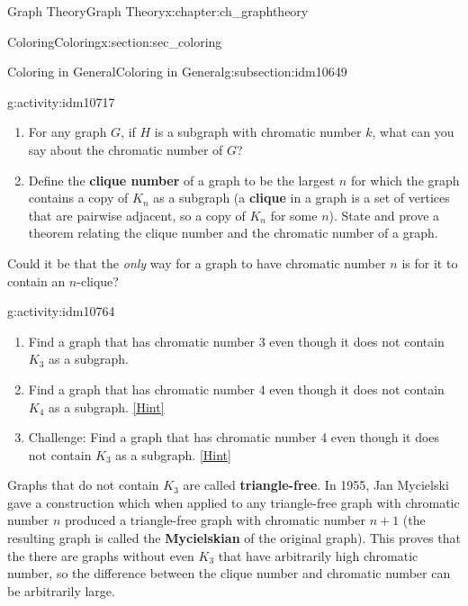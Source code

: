 \documentclass[oneside,10pt,]{book}
\newcommand{\terminology}[1]{\textbf{#1}}
\numberwithin{equation}{chapter}
\newcommand{\vtx}[2]{node[fill,circle,inner sep=0pt, minimum size=4pt,label=#1:#2]{}}
\renewcommand{\v}{\vtx{above}{}}
\begin{document}
\begin{chapterptx}{Graph Theory}{}{Graph Theory}{}{}{x:chapter:ch_graphtheory}
\begin{sectionptx}{Coloring}{}{Coloring}{}{}{x:section:sec_coloring}
\begin{subsectionptx}{Coloring in General}{}{Coloring in General}{}{}{g:subsection:idm10649}
\begin{activity}{}{g:activity:idm10717}
\begin{enumerate}[font=\bfseries,label=(\alph*),ref=\alph*]
\begin{sidebyside}{1}{0.375}{0.375}{0}
\begin{sbspanel}{0.25}
{
}%
\end{sbspanel}%
\end{sidebyside}%
\space\hspace*{0pt}\hfill{\tiny\hyperlink{g:hint:idm10724-back}{[Hint]}}\item{}For any graph \(G\), if \(H\) is a subgraph with chromatic number \(k\), what can you say about the chromatic number of \(G\)?%
\item{}Define the \terminology{clique number} of a graph to be the largest \(n\) for which the graph contains a copy of \(K_n\) as a subgraph (a \terminology{clique} in a graph is a set of vertices that are pairwise adjacent, so a copy of \(K_n\) for some \(n\)).  State and prove a theorem relating the clique number and the chromatic number of a graph.%
\end{enumerate}
\end{activity}
Could it be that the \emph{only} way for a graph to have chromatic number \(n\) is for it to contain an \(n\)-clique?%
\begin{activity}{}{g:activity:idm10764}%
\begin{enumerate}[font=\bfseries,label=(\alph*),ref=\alph*]
\item{}Find a graph that has chromatic number 3 even though it does not contain \(K_3\) as a subgraph.%
\item{}Find a graph that has chromatic number 4 even though it does not contain \(K_4\) as a subgraph.%
\space\hspace*{0pt}\hfill{\tiny\hyperlink{g:hint:idm10776-back}{[Hint]}}\item{}Challenge: Find a graph that has chromatic number 4 even though it does not contain \(K_3\) as a subgraph.%
\space\hspace*{0pt}\hfill{\tiny\hyperlink{g:hint:idm10790-back}{[Hint]}}\end{enumerate}
\end{activity}
Graphs that do not contain \(K_3\) are called \terminology{triangle-free}.  In 1955, Jan Mycielski gave a construction which when applied to any triangle-free graph with chromatic number \(n\) produced a triangle-free graph with chromatic number \(n+1\) (the resulting graph is called the \terminology{Mycielskian} of the original graph).  This proves that the there are graphs without even \(K_3\) that have arbitrarily high chromatic number, so the difference between the clique number and chromatic number can be arbitrarily large.%

\end{subsectionptx}
\end{sectionptx}
\end{chapterptx}
\end{document}
